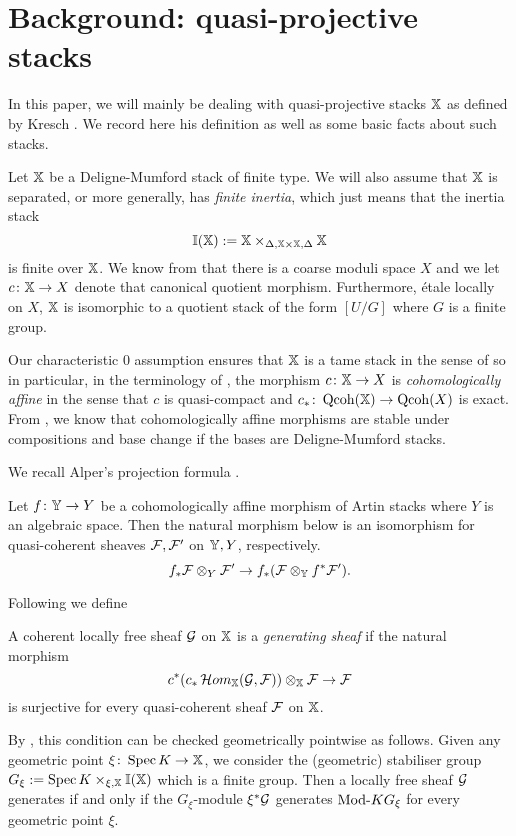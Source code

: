 \documentclass[12pt]{amsart}
\begin{document}
\section{Background: quasi-projective stacks}

In this paper, we will mainly be dealing with quasi-projective stacks $\mathbb{X}$ as defined by Kresch \cite{Kr}. We record here his definition as well as some basic facts about such stacks.

Let $\mathbb{X}$ be a Deligne-Mumford stack of finite type. We will also assume that $\mathbb{X}$ is separated, or more generally, has {\em finite inertia}, which just means that the inertia stack $$\mathbb{I}(\mathbb{X}) :=\mathbb{X} \times_{\Delta,\mathbb{X} \times \mathbb{X} , \Delta} \mathbb{X}$$ 
is finite over $\mathbb{X}$. We know from \cite{KeM} that there is a coarse moduli space $X$ and we let $c\colon \mathbb{X} \to X$ denote that canonical quotient morphism. Furthermore, \'etale locally on $X$, $\mathbb{X}$ is isomorphic to a quotient stack of the form $[U/G]$ where $G$ is a finite group.

Our characteristic 0 assumption ensures that $\mathbb{X}$ is a tame stack in the sense of \cite{AOV} so in particular, in the terminology of \cite[Definition~3.1]{Alp}, the morphism $c \colon \mathbb{X} \to X$ is {\em cohomologically affine} in the sense that $c$ is quasi-compact and $c_* \colon \operatorname{Qcoh}(\mathbb{X}) \to \operatorname{Qcoh} (X)$ is exact.  From \cite[Proposition~3.10]{Alp}, we know that cohomologically affine morphisms are stable under compositions and base change if the bases are Deligne-Mumford stacks. 

We recall Alper's projection formula \cite[Proposition~4.5]{Alp}.
\begin{proposition}   \label{prop:projection}
Let $f \colon \mathbb{Y} \to Y$ be a cohomologically affine morphism of Artin stacks where $Y$ is an algebraic space. Then the natural morphism below is an isomorphism for quasi-coherent sheaves $\mathcal{F}, \mathcal{F}'$ on $\mathbb{Y}, Y$, respectively.
$$ f_* \mathcal{F} \otimes_{Y} \mathcal{F}' \to f_* (\mathcal{F} \otimes_{\mathbb{Y}} f^* \mathcal{F}').$$
\end{proposition}

Following \cite{OS} we define
\begin{definition}
A coherent locally free sheaf $\mathcal{G}$ on $\mathbb{X}$ is a {\em generating sheaf} if the natural morphism
$$ c^*(c_*\mathop{{\mathcal{H}}om}\nolimits_{\mathbb{X}}(\mathcal{G}, \mathcal{F})) \otimes_{\mathbb{X}} \mathcal{F} \to \mathcal{F}$$
is surjective for every quasi-coherent sheaf $\mathcal{F}$ on $\mathbb{X}$. 
\end{definition}
By \cite[Theorem~5.2]{OS}, this condition can be checked geometrically pointwise as follows. Given any geometric point $\xi \colon \operatorname{Spec} K \to \mathbb{X}$, we consider the (geometric) stabiliser group $G_{\xi} := \operatorname{Spec} K \times_{\xi, \mathbb{X}} \mathbb{I}(\mathbb{X})$ which is a finite group. Then a locally free sheaf $\mathcal{G}$ generates if and only if the $G_{\xi}$-module $\xi^* \mathcal{G}$ generates $\textup{Mod-} KG_{\xi}$ for every geometric point $\xi$. 
\end{document}
